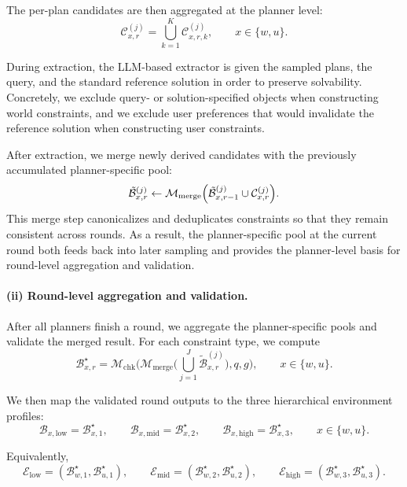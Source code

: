 The per-plan candidates are then aggregated at the planner level:
\[
\mathcal{C}^{(j)}_{x,r}
=
\bigcup_{k=1}^{K}
\mathcal{C}^{(j)}_{x,r,k},
\qquad
x \in \{w,u\}.
\]


During extraction, the LLM-based extractor is given the sampled plans, the query, and the standard reference solution in order to preserve solvability. Concretely, we exclude query- or solution-specified objects when constructing world constraints, and we exclude user preferences that would invalidate the reference solution when constructing user constraints.

After extraction, we merge newly derived candidates with the previously accumulated planner-specific pool:
\[
\tilde{\mathcal{B}}^{(j)}_{x,r}
\leftarrow
\mathcal{M}_{\mathrm{merge}}
\Bigl(
\tilde{\mathcal{B}}^{(j)}_{x,r-1}
\cup
\mathcal{C}^{(j)}_{x,r}
\Bigr).
\]
This merge step canonicalizes and deduplicates constraints so that they remain consistent across rounds. As a result, the planner-specific pool at the current round both feeds back into later sampling and provides the planner-level basis for round-level aggregation and validation.

\paragraph{(ii) Round-level aggregation and validation.}
After all planners finish a round, we aggregate the planner-specific pools and validate the merged result. For each constraint type, we compute
\[
\mathcal{B}_{x,r}^{\star}
=
\mathcal{M}_{\mathrm{chk}}
\Biggl(
\mathcal{M}_{\mathrm{merge}}
\Biggl(
\bigcup_{j=1}^{J}
\tilde{\mathcal{B}}^{(j)}_{x,r}
\Biggr),
q,
g
\Biggr),
\qquad
x \in \{w,u\}.
\]

We then map the validated round outputs to the three hierarchical environment profiles:
\[
\mathcal{B}_{x,\mathrm{low}}
=
\mathcal{B}_{x,1}^{\star},
\qquad
\mathcal{B}_{x,\mathrm{mid}}
=
\mathcal{B}_{x,2}^{\star},
\qquad
\mathcal{B}_{x,\mathrm{high}}
=
\mathcal{B}_{x,3}^{\star},
\qquad
x \in \{w,u\}.
\]

Equivalently,
\[
\mathcal{E}_{\mathrm{low}}
=
\left(
\mathcal{B}_{w,1}^{\star},
\mathcal{B}_{u,1}^{\star}
\right),
\qquad
\mathcal{E}_{\mathrm{mid}}
=
\left(
\mathcal{B}_{w,2}^{\star},
\mathcal{B}_{u,2}^{\star}
\right),
\qquad
\mathcal{E}_{\mathrm{high}}
=
\left(
\mathcal{B}_{w,3}^{\star},
\mathcal{B}_{u,3}^{\star}
\right).
\]

